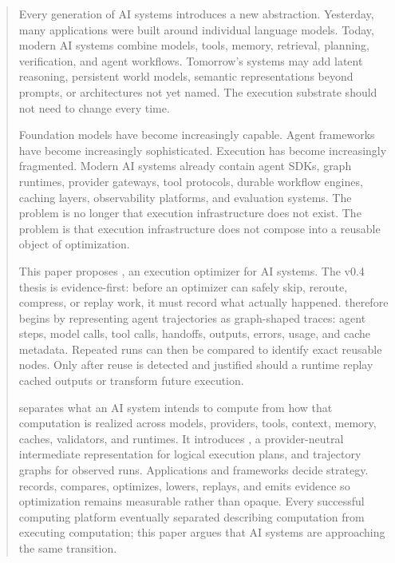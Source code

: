 \begin{abstract}
Every generation of AI systems introduces a new abstraction. Yesterday, many applications were built around individual language models. Today, modern AI systems combine models, tools, memory, retrieval, planning, verification, and agent workflows. Tomorrow's systems may add latent reasoning, persistent world models, semantic representations beyond prompts, or architectures not yet named. The execution substrate should not need to change every time.

Foundation models have become increasingly capable. Agent frameworks have become increasingly sophisticated. Execution has become increasingly fragmented.
Modern AI systems already contain agent SDKs, graph runtimes, provider gateways, tool protocols, durable workflow engines, caching layers, observability platforms, and evaluation systems. The problem is no longer that execution infrastructure does not exist. The problem is that execution infrastructure does not compose into a reusable object of optimization.

This paper proposes \migaki, an execution optimizer for AI systems. The v0.4 thesis is evidence-first: before an optimizer can safely skip, reroute, compress, or replay work, it must record what actually happened. \migaki{} therefore begins by representing agent trajectories as graph-shaped traces: agent steps, model calls, tool calls, handoffs, outputs, errors, usage, and cache metadata. Repeated runs can then be compared to identify exact reusable nodes. Only after reuse is detected and justified should a runtime replay cached outputs or transform future execution.

\migaki{} separates what an AI system intends to compute from how that computation is realized across models, providers, tools, context, memory, caches, validators, and runtimes. It introduces \mir, a provider-neutral intermediate representation for logical execution plans, and trajectory graphs for observed runs. Applications and frameworks decide strategy. \migaki{} records, compares, optimizes, lowers, replays, and emits evidence so optimization remains measurable rather than opaque. Every successful computing platform eventually separated describing computation from executing computation; this paper argues that AI systems are approaching the same transition.
\end{abstract}
